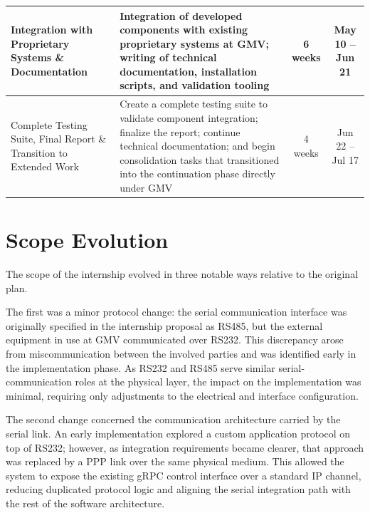 \begin{table}[htbp]
\begin{tabular}{|p{3cm}|p{8cm}|c|c|}
            \hline
            Integration with Proprietary Systems \& Documentation                                    &
            Integration of developed components with existing proprietary systems
            at \gls{GMV}; writing of technical documentation, installation scripts,
            and validation tooling                                                                   &
            6 weeks                                                                                  & May 10 -- Jun 21                                                                                                                                                  \\
            \hline
            Complete Testing Suite, Final Report \& Transition to Extended Work                      & Create a complete testing suite to validate component integration; finalize the report; continue technical documentation; and begin consolidation tasks that transitioned into the continuation phase directly under \gls{GMV} & 4 weeks  & Jun 22 -- Jul 17 \\
            \hline
      \end{tabular}
\end{table}

\section{Scope Evolution}
\label{sec:scope-evolution}

The scope of the internship evolved in three notable ways relative to the
original plan.

The first was a minor protocol change: the serial communication interface was
originally specified in the internship proposal as \gls{RS485}, but the
external equipment in use at \gls{GMV} communicated over \gls{RS232}. This
discrepancy arose from miscommunication between the involved parties and was
identified early in the implementation phase. As \gls{RS232} and \gls{RS485}
serve similar serial-communication roles at the physical layer, the impact on
the implementation was minimal, requiring only adjustments to the electrical
and interface configuration.

The second change concerned the communication architecture carried by the
serial link. An early implementation explored a custom application protocol on
top of \gls{RS232}; however, as integration requirements became clearer, that
approach was replaced by a \gls{PPP} link over the same physical medium. This
allowed the system to expose the existing gRPC control interface over a
standard IP channel, reducing duplicated protocol logic and aligning the serial
integration path with the rest of the software architecture.

